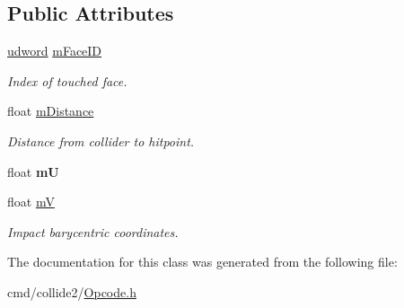 \subsection*{Public Attributes}
\begin{DoxyCompactItemize}
\item 
\hyperlink{IceTypes_8h_a44c6f1920ba5551225fb534f9d1a1733}{udword} \hyperlink{classOpcode_1_1CollisionFace_a8d51a85909185be5f17ab0c44db73425}{m\+Face\+ID}\hypertarget{classOpcode_1_1CollisionFace_a8d51a85909185be5f17ab0c44db73425}{}\label{classOpcode_1_1CollisionFace_a8d51a85909185be5f17ab0c44db73425}

\begin{DoxyCompactList}\small\item\em Index of touched face. \end{DoxyCompactList}\item 
float \hyperlink{classOpcode_1_1CollisionFace_a9407fcbe3e1a488a258b65ed0e1aa229}{m\+Distance}\hypertarget{classOpcode_1_1CollisionFace_a9407fcbe3e1a488a258b65ed0e1aa229}{}\label{classOpcode_1_1CollisionFace_a9407fcbe3e1a488a258b65ed0e1aa229}

\begin{DoxyCompactList}\small\item\em Distance from collider to hitpoint. \end{DoxyCompactList}\item 
float {\bfseries mU}\hypertarget{classOpcode_1_1CollisionFace_aee68a4a1d8f22e2ebf51051a41f6c1d8}{}\label{classOpcode_1_1CollisionFace_aee68a4a1d8f22e2ebf51051a41f6c1d8}

\item 
float \hyperlink{classOpcode_1_1CollisionFace_a027fafc2b5906c9e43c635c428b4dc96}{mV}\hypertarget{classOpcode_1_1CollisionFace_a027fafc2b5906c9e43c635c428b4dc96}{}\label{classOpcode_1_1CollisionFace_a027fafc2b5906c9e43c635c428b4dc96}

\begin{DoxyCompactList}\small\item\em Impact barycentric coordinates. \end{DoxyCompactList}\end{DoxyCompactItemize}


The documentation for this class was generated from the following file\+:\begin{DoxyCompactItemize}
\item 
cmd/collide2/\hyperlink{Opcode_8h}{Opcode.\+h}\end{DoxyCompactItemize}
